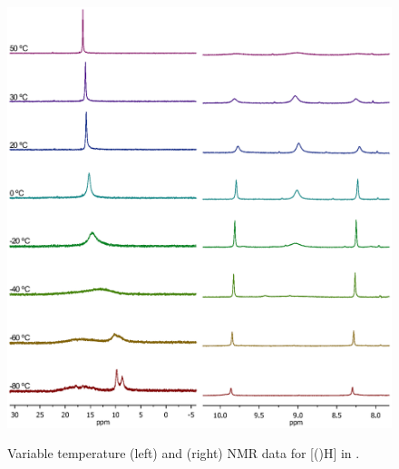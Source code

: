 \begin{figure}[h!]
\begin{center}
\vspace{0.5cm}
\includegraphics[scale=0.8, trim = 0cm 6.8cm 0cm 2cm]{../NMR/PhosphoniumVTNMRboth.eps}
\caption[Variable temperature \phosphorus{} and \proton{} NMR data for {[}(\tButhixantphos)H{]}]{Variable temperature \phosphorus{} (left) and \proton{} (right) NMR data for [(\tButhixantphos)H] in .}
\vspace{0.2cm}
\label{VTStBuH}
\end{center}
\end{figure}
\vspace{0.2cm}



